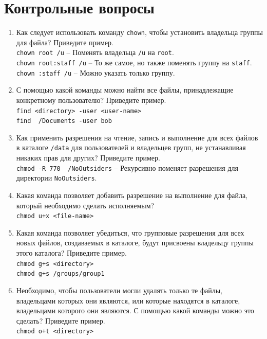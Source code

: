 \documentclass[12pt]{article}
\begin{document}
\section{Контрольные вопросы}
\begin{enumerate}
	\item Как следует использовать команду \texttt{chown}, чтобы установить владельца группы для файла? Приведите пример.\\
	      \texttt{chown root /u} -- Поменять владельца \texttt{/u} на \texttt{root}.\\
	      \texttt{chown root:staff /u} -- То же самое, но также поменять группу на \texttt{staff}.\\
	      \texttt{chown :staff /u} -- Можно указать только группу.

	\item С помощью какой команды можно найти все файлы, принадлежащие конкретному пользователю? Приведите пример.\\
	      \texttt{find <directory> -user <user-name>}\\
	      \texttt{find ~/Documents -user bob}

	\item Как применить разрешения на чтение, запись и выполнение для всех файлов в каталоге \texttt{/data} для пользователей и владельцев групп, не устанавливая никаких прав для других? Приведите пример.\\
	      \texttt{chmod -R 770 ~/NoOutsiders} -- Рекурсивно поменяет разрешения для директории \texttt{NoOutsiders}.

	\item Какая команда позволяет добавить разрешение на выполнение для файла, который необходимо сделать исполняемым?\\
	      \texttt{chmod u+x <file-name>}

	\item Какая команда позволяет убедиться, что групповые разрешения для всех новых файлов, создаваемых в каталоге, будут присвоены владельцу группы этого каталога? Приведите пример.\\
	      \texttt{chmod g+s <directory>}\\
	      \texttt{chmod g+s /groups/group1}

	\item Необходимо, чтобы пользователи могли удалять только те файлы, владельцами которых они являются, или которые находятся в каталоге, владельцами которого они являются. С помощью какой команды можно это сделать? Приведите пример.\\
	      \texttt{chmod o+t <directory>}


\end{enumerate}
\end{document}
